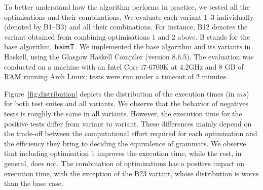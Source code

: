 To better understand how the algorithm performs in practice, we tested
all the optimisations and their combinations. We evaluate each variant 
1--3 individually (denoted
by B1--B3) and all their combinations. For instance, B12 denotes
the variant obtained from combining optimisations 1 and 2 above.
B stands for the base algorithm, $\mathsf{bisimT}$.
%
We implemented the base algorithm and its
variants %
in Haskell, using the Glasgow Haskell Compiler (version
8.6.5).
The evaluation was conducted on a machine with an Intel Core i7-6700K
at 4.2GHz and 8 GB of RAM running Arch Linux; tests were run under a
timeout of 2 minutes.

%

Figure~\ref{fig:distribution} depicts the distribution of the
execution times (in $ms$) for both test suites and all variants. We
observe that the behavior of negatives tests is roughly the same in
all variants. However, the execution time for the positive tests
differ from variant to variant. These differences mainly depend on the
trade-off between the computational effort required for each
optimisation and the efficiency they bring to deciding the equivalence
of grammars.  We observe that including optimisation 1 improves the
execution time, while the rest, in general, does not. The combination
of optimizations has a positive impact on execution time, with the
exception of the B23 variant, whose distribution is worse than the
base case.

